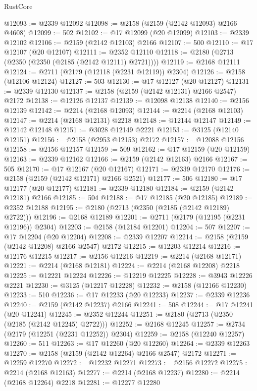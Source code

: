 \begin{lexlean}{RustCore}
\begin{coremodule}
@12093 := @2339 @12092
@12098 := @2158 (@2159 (@2142 @12093) @2166 @4608)
@12099 := 502
@12102 := @17 @12099 (@20 @12099)
@12103 := @2339 @12102
@12106 := @2159 (@2142 @12103) @2166
@12107 := 500
@12110 := @17 @12107 (@20 @12107)
@12111 := @2352 @12110
@12118 := @2180 (@2713 (@2350 (@2350 (@2185 (@2142 @12111) @2721))))
@12119 := @2168 @12111
@12124 := @2711 (@2179 (@12118 (@2231 @12119)) @2304)
@12126 := @2158 (@12106 @12124)
@12127 := 503
@12130 := @17 @12127 (@20 @12127)
@12131 := @2339 @12130
@12137 := @2158 (@2159 (@2142 @12131) @2166 @2547) @2172
@12138 := @12126 @12137
@12139 := @12098 @12138
@12140 := @2156 @12139
@12142 := @2214 (@2168 @12093)
@12144 := @2214 (@2168 @12103)
@12147 := @2214 (@2168 @12131) @2218
@12148 := @12144 @12147
@12149 := @12142 @12148
@12151 := @3028 @12149 @2221
@12153 := @3125 (@12140 @12151)
@12156 := @2158 (@2953 @12153) @2172
@12157 := @12088 @12156
@12158 := @2156 @12157
@12159 := 509
@12162 := @17 @12159 (@20 @12159)
@12163 := @2339 @12162
@12166 := @2159 (@2142 @12163) @2166
@12167 := 505
@12170 := @17 @12167 (@20 @12167)
@12171 := @2339 @12170
@12176 := @2158 (@2159 (@2142 @12171) @2166 @2521)
@12177 := 506
@12180 := @17 @12177 (@20 @12177)
@12181 := @2339 @12180
@12184 := @2159 (@2142 @12181) @2166
@12185 := 504
@12188 := @17 @12185 (@20 @12185)
@12189 := @2352 @12188
@12195 := @2180 (@2713 (@2350 (@2185 (@2142 @12189) @2722)))
@12196 := @2168 @12189
@12201 := @2711 (@2179 (@12195 (@2231 @12196)) @2304)
@12203 := @2158 (@12184 @12201)
@12204 := 507
@12207 := @17 @12204 (@20 @12204)
@12208 := @2339 @12207
@12214 := @2158 (@2159 (@2142 @12208) @2166 @2547) @2172
@12215 := @12203 @12214
@12216 := @12176 @12215
@12217 := @2156 @12216
@12219 := @2214 (@2168 @12171)
@12221 := @2214 (@2168 @12181)
@12224 := @2214 (@2168 @12208) @2218
@12225 := @12221 @12224
@12226 := @12219 @12225
@12228 := @3943 @12226 @2221
@12230 := @3125 (@12217 @12228)
@12232 := @2158 (@12166 @12230)
@12233 := 510
@12236 := @17 @12233 (@20 @12233)
@12237 := @2339 @12236
@12240 := @2159 (@2142 @12237) @2166
@12241 := 508
@12244 := @17 @12241 (@20 @12241)
@12245 := @2352 @12244
@12251 := @2180 (@2713 (@2350 (@2185 (@2142 @12245) @2722)))
@12252 := @2168 @12245
@12257 := @2734 (@2179 (@12251 (@2231 @12252)) @2304)
@12259 := @2158 (@12240 @12257)
@12260 := 511
@12263 := @17 @12260 (@20 @12260)
@12264 := @2339 @12263
@12270 := @2158 (@2159 (@2142 @12264) @2166 @2547) @2172
@12271 := @12259 @12270
@12272 := @12232 @12271
@12273 := @2156 @12272
@12275 := @2214 (@2168 @12163)
@12277 := @2214 (@2168 @12237)
@12280 := @2214 (@2168 @12264) @2218
@12281 := @12277 @12280

\end{coremodule}
\end{lexlean}

